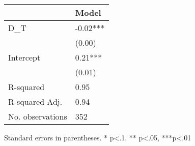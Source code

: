 \begin{table}
\caption{}
\label{}
\begin{center}
\begin{tabular}{ll}
\hline
                                 & Model     \\
\hline
D\_T                             & -0.02***  \\
                                 & (0.00)    \\
Intercept                        & 0.21***   \\
                                 & (0.01)    \\
R-squared                        & 0.95      \\
R-squared Adj.                   & 0.94      \\
No. observations                 & 352       \\
\hline
\end{tabular}
Standard errors in parentheses. \newline 
* p<.1, ** p<.05, ***p<.01
\end{center}
\end{table}